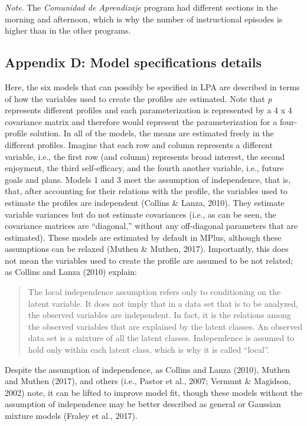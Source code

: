 \documentclass[]{book}
\theoremstyle{definition}
\theoremstyle{definition}
\theoremstyle{definition}
\theoremstyle{remark}
\begin{document}
\emph{Note}. The \emph{Comunidad de Aprendizaje} program had different
sections in the morning and afternoon, which is why the number of
instructional episodes is higher than in the other programs.

\subsection{Appendix D: Model specifications
details}\label{appendix-d-model-specifications-details}

Here, the six models that can possibly be specified in LPA are described
in terms of how the variables used to create the profiles are estimated.
Note that \emph{p} represents different profiles and each
parameterization is represented by a 4 x 4 covariance matrix and
therefore would represent the parameterization for a four-profile
solution. In all of the models, the means are estimated freely in the
different profiles. Imagine that each row and column represents a
different variable, i.e., the first row (and column) represents broad
interest, the second enjoyment, the third self-efficacy, and the fourth
another variable, i.e., future goals and plans. Models 1 and 3 meet the
assumption of independence, that is, that, after accounting for their
relations with the profile, the variables used to estimate the profiles
are independent (Collins \& Lanza, 2010). They estimate variable
variances but do not estimate covariances (i.e., as can be seen, the
covariance matrices are ``diagonal,'' without any off-diagonal
parameters that are estimated). These models are estimated by default in
MPlus, although these assumptions can be relaxed (Muthen \& Muthen,
2017). Importantly, this does not mean the variables used to create the
profile are assumed to be not related; as Collins and Lanza (2010)
explain:

\begin{quote}
The local independence assumption refers only to conditioning on the
latent variable. It does not imply that in a data set that is to be
analyzed, the observed variables are independent. In fact, it is the
relations among the observed variables that are explained by the latent
classes. An observed data set is a mixture of all the latent classes.
Independence is assumed to hold only within each latent class, which is
why it is called ``local''.
\end{quote}

Despite the assumption of independence, as Collins and Lanza (2010),
Muthen and Muthen (2017), and others (i.e., Pastor et al., 2007; Vermunt
\& Magidson, 2002) note, it can be lifted to improve model fit, though
these models without the assumption of independence may be better
described as general or Gaussian mixture models (Fraley et al., 2017).
\end{document}
